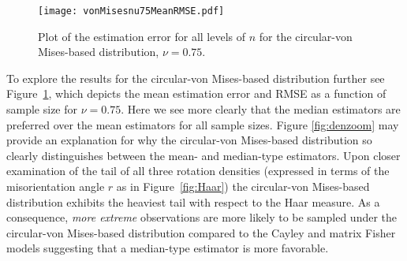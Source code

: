 
\begin{figure}[h!]
\centering
\texttt{[image: vonMisesnu75MeanRMSE.pdf]}
\caption{Plot of the estimation error for all levels of $n$ for the circular-von Mises-based distribution,  $\nu=0.75$.}  \label{fig:vmnu75}
\end{figure}

To explore the results for the circular-von Mises-based distribution further see Figure~\ref{fig:vmnu75}, which depicts the mean estimation error and RMSE as a function of sample size for $\nu=0.75$.  Here we see more clearly that the median estimators are preferred over the mean estimators for all sample sizes.  Figure \ref{fig:denzoom} may provide an explanation for why the circular-von Mises-based distribution so clearly distinguishes between the mean- and median-type estimators.  Upon closer examination of the tail of all three rotation densities (expressed in terms of the misorientation angle $r$ as in Figure~\ref{fig:Haar}) the circular-von Mises-based distribution exhibits the heaviest tail with respect to the Haar measure. As a consequence, \textit{more extreme} observations are more likely to be sampled under the circular-von Mises-based distribution compared to the Cayley and matrix Fisher models suggesting that a median-type estimator is more favorable. 

